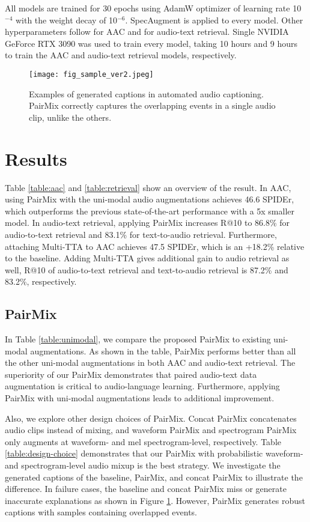 \documentclass{INTERSPEECH2023}
\begin{document}
All models are trained for 30 epochs using AdamW optimizer of learning rate 10$^{-4}$ with the weight decay of 10$^{-6}$. SpecAugment is applied to every model. Other hyperparameters follow \cite{mei2021audio} for AAC and \cite{Mei2022-qx} for audio-text retrieval. Single NVIDIA GeForce RTX 3090 was used to train every model, taking 10 hours and 9 hours to train the AAC and audio-text retrieval models, respectively.

\begin{figure}
    \centering
    \texttt{[image: fig\_sample\_ver2.jpeg]}
    \caption{Examples of generated captions in automated audio captioning. PairMix correctly captures the overlapping events in a single audio clip, unlike the others.}
    \label{fig:fig_sample}
\end{figure}

\section{Results}
\label{sec:majhead}
Table \ref{table:aac} and \ref{table:retrieval} show an overview of the result. In AAC, using PairMix with the uni-modal audio augmentations achieves 46.6 SPIDEr, which outperforms the previous state-of-the-art performance with a 5x smaller model. In audio-text retrieval, applying PairMix increases R@10 to 86.8\% for audio-to-text retrieval and 83.1\% for text-to-audio retrieval. Furthermore, attaching Multi-TTA to AAC achieves 47.5 SPIDEr, which is an +18.2\% relative to the baseline. Adding Multi-TTA gives additional gain to audio retrieval as well, R@10 of audio-to-text retrieval and text-to-audio retrieval is 87.2\% and 83.2\%, respectively. 

\subsection{PairMix}
In Table \ref{table:unimodal}, we compare the proposed PairMix to existing uni-modal augmentations. As shown in the table, PairMix performs better than all the other uni-modal augmentations in both AAC and audio-text retrieval. The superiority of our PairMix demonstrates that paired audio-text data augmentation is critical to audio-language learning.  Furthermore, applying PairMix with uni-modal augmentations leads to additional improvement. 

Also, we explore other design choices of PairMix. Concat PairMix concatenates audio clips instead of mixing, and waveform PairMix and spectrogram PairMix only augments at waveform- and mel spectrogram-level, respectively. Table \ref{table:design-choice} demonstrates that our PairMix with probabilistic waveform- and spectrogram-level audio mixup is the best strategy. We investigate the generated captions of the baseline, PairMix, and concat PairMix to illustrate the difference. In failure cases, the baseline and concat PairMix miss or generate inaccurate explanations as shown in Figure \ref{fig:fig_sample}. However, PairMix generates robust captions with samples containing overlapped events.
\end{document}
